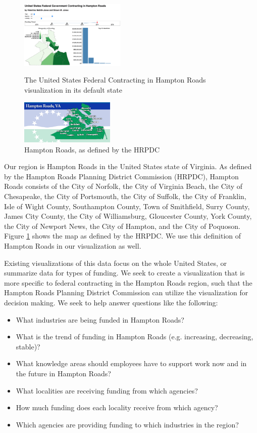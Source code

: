 \documentclass[10pt,journal,compsoc]{IEEEtran}
\begin{document}
\begin{figure}[t]
	\centering
	\includegraphics[width=0.45\textwidth]{images/teaser-screenie.png}
	\caption{The United States Federal Contracting in Hampton Roads visualization in its default state}
	\label{fig:default-main-vis}

	\vspace{3em}

	\centering
	\includegraphics[width=0.4\textwidth]{images/HRFlagMapslide.png}
	\caption{Hampton Roads, as defined by the HRPDC}
	\label{fig:hrpdc-flag}
\end{figure}

Our region is Hampton Roads in the United States state of Virginia.  As defined by the Hampton Roads Planning District Commission (HRPDC), Hampton Roads consists of the City of Norfolk, the City of Virginia Beach, the City of Chesapeake, the City of Portsmouth, the City of Suffolk, the City of Franklin, Isle of Wight County, Southampton County, Town of Smithfield, Surry County, James City County, the City of Williamsburg, Gloucester County, York County, the City of Newport News, the City of Hampton, and the City of Poquoson.  Figure \ref{fig:hrpdc-flag} shows the map as defined by the HRPDC.  We use this definition of Hampton Roads in our visualization as well.

Existing visualizations of this data focus on the whole United States, or summarize data for types of funding.  We seek to create a visualization that is more specific to federal contracting in the Hampton Roads region, such that the Hampton Roads Planning District Commission can utilize the visualization for decision making.  We seek to help answer questions like the following:
\begin{itemize}
\item What industries are being funded in Hampton Roads?
\item What is the trend of funding in Hampton Roads (e.g. increasing, decreasing, stable)?
\item What knowledge areas should employees have to support work now and in the future in Hampton Roads?
\item What localities are receiving funding from which agencies?
\item How much funding does each locality receive from which agency?
\item Which agencies are providing funding to which industries in the region?
\end{itemize}
\end{document}
